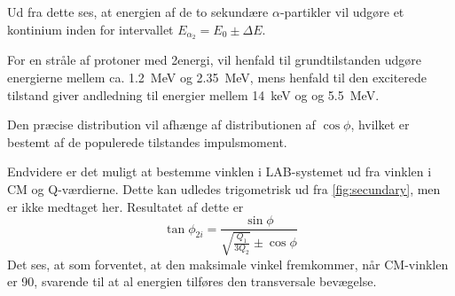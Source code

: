 Ud fra dette ses, at energien af de to sekundære $\alpha$-partikler vil udgøre et kontinium inden for
intervallet $E_{\alpha_{2}} = E_{0} \pm \Delta E$.

For en stråle af protoner med 2\MeV energi, vil henfald til grundtilstanden udgøre energierne mellem
ca. \SI{1.2}{\MeV} og \SI{2.35}{\MeV}, mens henfald til den exciterede tilstand giver andledning til
energier mellem \SI{14}{\keV} og og \SI{5.5}{\MeV}. 

Den præcise distribution vil afhænge af distributionen af $\cos \phi$, hvilket er bestemt af de populerede
tilstandes impulsmoment. 

Endvidere er det muligt at bestemme vinklen i LAB-systemet ud fra vinklen i CM og Q-værdierne. Dette
kan udledes trigometrisk ud fra \cref{fig:secundary}, men er ikke medtaget her. Resultatet af dette
er
\begin{equation}
  \label{eq:sekv-vinkel}
  \tan \phi_{2i} = \frac{\sin \phi}{\sqrt{\frac{Q_{1}}{3Q_{2}}} \pm \cos \phi}
\end{equation}
Det ses, at som forventet, at den maksimale vinkel fremkommer, når CM-vinklen er 90\degree, svarende
til at al energien tilføres den transversale bevægelse.